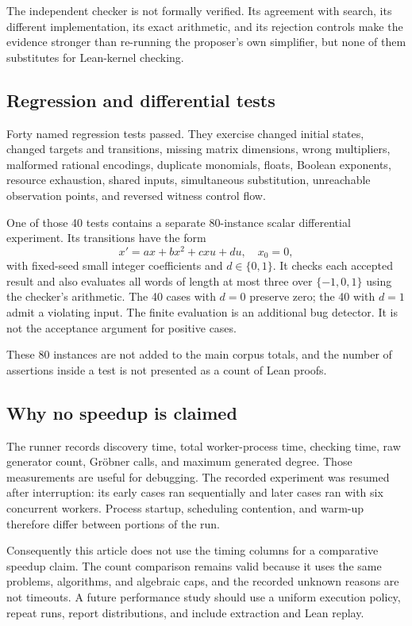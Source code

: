 \documentclass[11pt,letterpaper]{article}
\theoremstyle{definition}
\begin{document}
The independent checker is not formally verified. Its agreement with search,
its different implementation, its exact arithmetic, and its rejection controls
make the evidence stronger than re-running the proposer's own simplifier, but
none of them substitutes for Lean-kernel checking.

\subsection{Regression and differential tests}
Forty named regression tests passed. They exercise changed initial states,
changed targets and transitions, missing matrix dimensions, wrong multipliers,
malformed rational encodings, duplicate monomials, floats, Boolean exponents,
resource exhaustion, shared inputs, simultaneous substitution, unreachable
observation points, and reversed witness control flow.

One of those 40 tests contains a separate 80-instance scalar differential
experiment. Its transitions have the form
\[
 x'=a x+b x^2+c xu+d u,\quad x_0=0,
\]
with fixed-seed small integer coefficients and $d\in\{0,1\}$. It checks each
accepted result and also evaluates all words of length at most three over
$\{-1,0,1\}$ using the checker's arithmetic. The 40 cases with $d=0$ preserve
zero; the 40 with $d=1$ admit a violating input. The finite evaluation is an
additional bug detector. It is not the acceptance argument for positive cases.

These 80 instances are not added to the main corpus totals, and the number of
assertions inside a test is not presented as a count of Lean proofs.

\subsection{Why no speedup is claimed}
The runner records discovery time, total worker-process time, checking time,
raw generator count, Gr\"obner calls, and maximum generated degree. Those
measurements are useful for debugging. The recorded experiment was resumed
after interruption: its early cases ran sequentially and later cases ran with
six concurrent workers. Process startup, scheduling contention, and warm-up
therefore differ between portions of the run.

Consequently this article does not use the timing columns for a comparative
speedup claim. The count comparison remains valid because it uses the same
problems, algorithms, and algebraic caps, and the recorded unknown reasons are
not timeouts. A future performance study should use a uniform execution policy,
repeat runs, report distributions, and include extraction and Lean replay.
\end{document}

